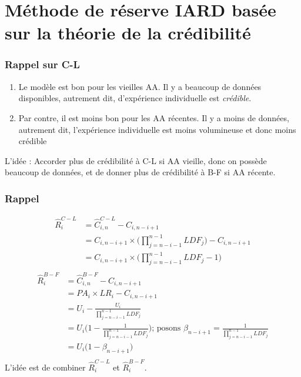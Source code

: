 \documentclass[11pt,french]{report}
\begin{document}
\section{Méthode de réserve IARD basée sur la théorie de la crédibilité}

\subsubsection*{Rappel sur C-L }
\begin{enumerate}
\item Le modèle est  bon pour les vieilles AA. Il y a beaucoup de données disponibles, autrement dit, d'expérience individuelle est \textit{crédible}.
\item Par contre, il est moins bon pour les AA récentes. Il y a moins de données, autrement dit, l'expérience individuelle est moins volumineuse et donc moins crédible 
\end{enumerate}
L'idée : Accorder plus de crédibilité à C-L si AA vieille, donc on possède beaucoup de données, et de donner plus de crédibilité à B-F si AA récente.

\subsubsection*{Rappel}
\begin{align*}
\widehat{R}_i^{C-L} &= \widehat{C}_{i,n}^{C-L} - C_{i, n-i+1} \\
&= C_{i,n-i+1} \times \Big(\prod_{j=n-i-1}^{n-1} LDF_j \Big) - C_{i,n-i+1}\\
&= C_{i,n-i+1} \times \Big(\prod_{j=n-i-1}^{n-1} LDF_j - 1 \Big) \\
\end{align*}
\begin{align*}
\widehat{R}_i^{B-F} &= \widehat{C}_{i,n}^{B-F} - C_{i, n-i+1} \\
&= PA_i \times LR_i  - C_{i, n-i+1}\\
&= U_i - \frac{U_i}{\prod_{j=n-i-1}^{n-1} LDF_j}\\
&= U_i \Bigg( 1 - \frac{1}{\prod_{j=n-i-1}^{n-1} LDF_j} \Bigg) \text{; posons } \beta_{n-i+1} = \frac{1}{\prod_{j=n-i-1}^{n-1} LDF_j}\\
&= U_i \Bigg( 1 - \beta_{n-i+1} \Bigg) \\
\end{align*}
L'idée est de combiner $\widehat{R}_i^{C-L}$  et $\widehat{R}_i^{B-F}$.
\end{document}
